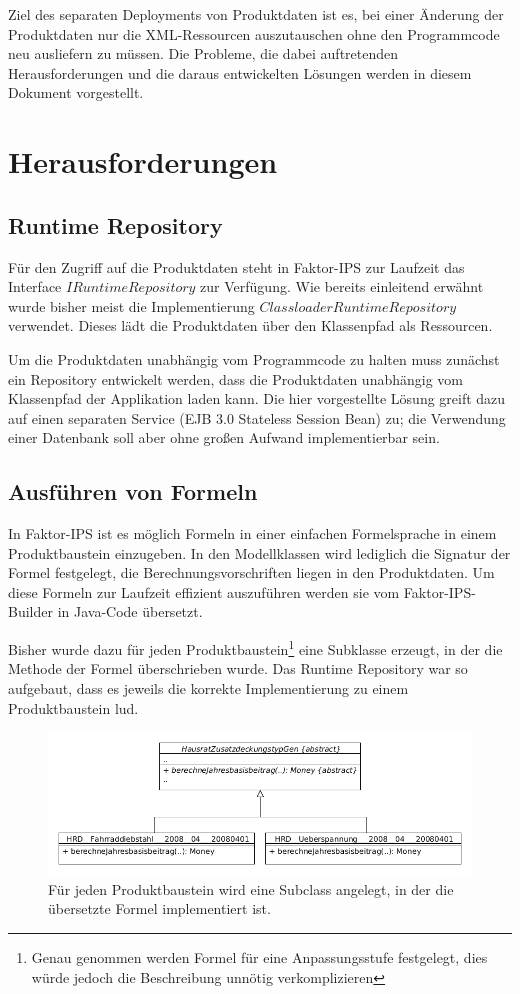 \documentclass[headsepline=true, footsepline=true]{scrartcl}
\begin{document}
Ziel des separaten Deployments von Produktdaten ist es, bei einer Änderung der
Produktdaten nur die XML-Ressourcen auszutauschen ohne den Programmcode neu
ausliefern zu müssen. Die Probleme, die dabei auftretenden Herausforderungen und
die daraus entwickelten Lösungen werden in diesem Dokument vorgestellt.

\section{Herausforderungen}

\subsection{Runtime Repository}

Für den Zugriff auf die Produktdaten steht in Faktor-IPS zur Laufzeit das
Interface $IRuntimeRepository$ zur Verfügung. Wie bereits einleitend
erwähnt wurde bisher meist die Implementierung
$ClassloaderRuntimeRepository$ verwendet. Dieses lädt die Produktdaten über den
Klassenpfad als Ressourcen.

Um die Produktdaten unabhängig vom Programmcode zu halten muss zunächst ein
Repository entwickelt werden, dass die Produktdaten unabhängig vom Klassenpfad
der Applikation laden kann. Die hier vorgestellte Lösung greift dazu auf einen
separaten Service (EJB 3.0 Stateless Session Bean) zu; die Verwendung einer
Datenbank soll aber ohne großen Aufwand implementierbar sein.

\subsection{Ausführen von Formeln}

In Faktor-IPS ist es möglich Formeln in einer einfachen Formelsprache in einem
Produktbaustein einzugeben. In den Modellklassen wird lediglich die Signatur der
Formel festgelegt, die Berechnungsvorschriften liegen in den Produktdaten. Um
diese Formeln zur Laufzeit effizient auszuführen werden sie vom
Faktor-IPS-Builder in Java-Code übersetzt.

Bisher wurde dazu für jeden Produktbaustein\footnote{Genau genommen werden
Formel für eine Anpassungsstufe festgelegt, dies würde jedoch die Beschreibung
unnötig verkomplizieren} eine Subklasse erzeugt, in der die Methode der Formel
überschrieben wurde. Das Runtime Repository war so aufgebaut, dass es jeweils die
korrekte Implementierung zu einem Produktbaustein lud.

\begin{figure}[htb] \centering
\includegraphics[width=13cm]{./pics/subclassing.png}
\caption{Für jeden Produktbaustein wird eine Subclass angelegt, in der die
übersetzte Formel implementiert ist.}
\label{subclassing}
\end{figure}
\end{document}
